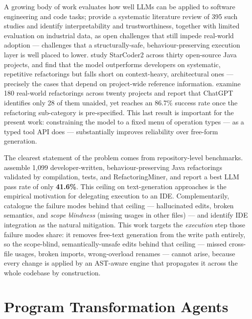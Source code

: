 A growing body of work evaluates how well LLMs can be applied to software
engineering and code tasks; \citet{hou2024llm4se} provide a systematic literature
review of 395 such studies and identify interpretability and trustworthiness,
together with limited evaluation on industrial data, as open challenges that still
impede real-world adoption --- challenges that a structurally-safe,
behaviour-preserving execution layer is well placed to lower.
\citet{cordeiro2024refactoring} study StarCoder2 across thirty open-source Java
projects, and find that the model outperforms developers on systematic, repetitive
refactorings but falls short on context-heavy, architectural ones --- precisely the
cases that depend on project-wide reference information. \citet{potentialllm2024} examine 180
real-world refactorings across twenty projects and report that ChatGPT
identifies only 28 of them unaided, yet reaches an 86.7\% success rate once the
refactoring sub-category is pre-specified. This last result is important for the
present work: constraining the model to a fixed menu of operation types --- as a
typed tool API does --- substantially improves reliability over free-form
generation.

The clearest statement of the problem comes from repository-level benchmarks.
\citet{swerefactor2025} assemble 1{,}099 developer-written, behaviour-preserving
Java refactorings validated by compilation, tests, and RefactoringMiner, and
report a best LLM pass rate of only \textbf{41.6\%}. This ceiling on
text-generation approaches is the empirical motivation for delegating execution
to an IDE. Complementarily, \citet{llmrefactorlimits2025} catalogue the failure
modes behind that ceiling --- hallucinated edits, broken semantics, and
\emph{scope blindness} (missing usages in other files) --- and identify IDE
integration as the natural mitigation. This work targets the \emph{execution} step those failure modes share: it removes
free-text generation from the write path entirely, so the scope-blind,
semantically-unsafe edits behind that ceiling --- missed cross-file usages, broken
imports, wrong-overload renames --- cannot arise, because every change is applied by
an AST-aware engine that propagates it across the whole codebase by construction.

\section{Program Transformation Agents}
\label{sec:bg-agents}

